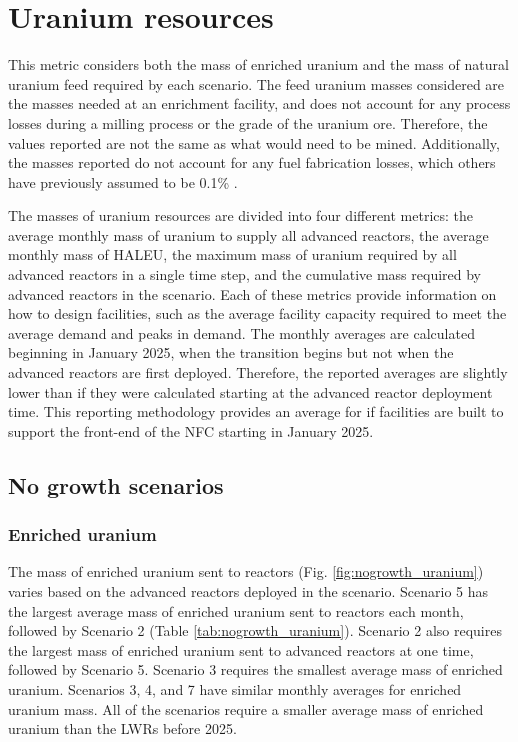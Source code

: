 \section{Uranium resources}
This metric considers  
both the mass of enriched uranium and the mass of natural uranium feed 
required by each scenario. The feed uranium masses 
considered are the masses needed at an enrichment facility,
and does not account for any process losses during a milling process 
or the grade of the uranium ore. Therefore, the values reported are 
not the same as what would 
need to be mined. Additionally, the masses reported do not account for 
any fuel fabrication losses, which others have previously assumed to 
be 0.1\% \cite{wigeland_nuclear_2014}. 

The masses of uranium resources are divided into four 
different metrics: the average monthly mass of uranium to supply all 
advanced reactors, the average monthly mass of \gls{HALEU}, the 
maximum mass of uranium required by all advanced 
reactors in a single time step, and the cumulative mass required by
advanced reactors in the 
scenario. Each of these metrics provide information 
on how to design facilities, such as the average facility capacity 
required to meet the average demand and peaks in demand. The monthly 
averages are calculated beginning in January 2025, 
when the transition begins but not when the advanced reactors 
are first deployed. Therefore, the reported averages are slightly lower 
than if they were calculated starting at the advanced reactor deployment 
time. This reporting methodology provides an average for if 
facilities are built to support the front-end of the \gls{NFC} starting 
in January 2025. 

\subsection{No growth scenarios}
\subsubsection{Enriched uranium}
The mass of enriched uranium sent to reactors (Fig. \ref{fig:nogrowth_uranium})
varies based on the advanced reactors deployed in the scenario. 
Scenario 5 has the largest average mass of enriched uranium sent to 
reactors each month, followed by Scenario 2 (Table 
\ref{tab:nogrowth_uranium}). 
Scenario 2 also requires the largest mass of enriched uranium sent 
to advanced reactors at one time, followed by Scenario 5.
Scenario 3 requires the smallest average 
mass of enriched uranium. Scenarios 3, 4, and 7 
have similar monthly averages for enriched uranium mass. All of the 
scenarios require a smaller 
average mass of enriched uranium than the \glspl{LWR} before 2025. 

